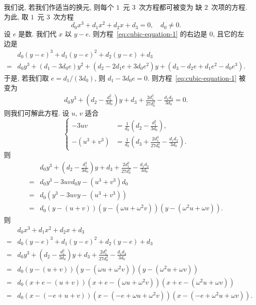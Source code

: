 \documentclass[../libro.tex]{subfiles}
\begin{document}
我们说, 若我们作适当的换元,
则每个 \(1\)~元 \(3\)~次方程都可被变为%
缺 \(2\)~次项的方程.
为此, 取 \(1\)~元 \(3\)~次方程
\begin{equation}
    d_0 x^3 + d_1 x^2 + d_2 x + d_3 = 0,
    \quad d_0 \neq 0.
    \label{eq:cubic-equation-1}
\end{equation}
设 \(e\) 是数.
我们代 \(x\) 以 \(y - e\).
则方程~\eqref{eq:cubic-equation-1} 的右边是 \(0\),
且它的左边是
\begin{align*}
    &
    d_0 (y - e)^3
    + d_1 (y - e)^2
    + d_2 (y - e)
    + d_3
    \\
    = {} &
    d_0 y^3
    + (d_1 - 3d_0 e) y^2
    + (d_2 - 2d_1 e + 3d_0 e^2) y
    + (d_3 - d_2 e + d_1 e^2 - d_0 e^3).
\end{align*}
于是, 若我们取 \(e = d_1/(3d_0)\),
则 \(d_1 - 3d_0 e = 0\).
则方程~\eqref{eq:cubic-equation-1} 被变为
\begin{align*}
    d_0 y^3 + \left(d_2 - \frac{d_1^2}{3d_0} \right)y
    + d_3 + \frac{2 d_1^3}{27 d_0^2} - \frac{d_1 d_2}{3d_0}
    = 0.
\end{align*}
则我们可解此方程.
设 \(u\), \(v\) 适合
\begin{equation*}
    \left\{ %
    \begin{aligned}
        -3uv         & =
        \frac{1}{d_0}
        \left(d_2 - \frac{d_1^2}{3d_0} \right),
        \\
        -(u^3 + v^3) & =
        \frac{1}{d_0}
        \left(d_3 + \frac{2 d_1^3}{27 d_0^2} - \frac{d_1 d_2}{3d_0}\right).
    \end{aligned}
    \right. %
\end{equation*}
则
\begin{align*}
    &
    d_0 y^3 + \left(d_2 - \frac{d_1^2}{3d_0} \right)y
    + d_3 + \frac{2 d_1^3}{27 d_0^2} - \frac{d_1 d_2}{3d_0}
    \\
    = {} &
    d_0 y^3 - 3 u v d_0 y - (u^3 + v^3) d_0
    \\
    = {} &
    d_0 (y^3 - 3 u v y - (u^3 + v^3))
    \\
    = {} &
    d_0
    (y - (u + v))
    (y - (\omega u + \omega^2 v))
    (y - (\omega^2 u + \omega v)).
\end{align*}
则
\begin{align*}
    &
    d_0 x^3 + d_1 x^2 + d_2 x + d_3
    \\
    = {} &
    d_0 (y - e)^3 + d_1 (y - e)^2 + d_2 (y - e) + d_3
    \\
    = {} &
    d_0 y^3 + \left(d_2 - \frac{d_1^2}{3d_0} \right)y
    + d_3 + \frac{2 d_1^3}{27 d_0^2} - \frac{d_1 d_2}{3d_0}
    \\
    = {} &
    d_0
    (y - (u + v))
    (y - (\omega u + \omega^2 v))
    (y - (\omega^2 u + \omega v))
    \\
    = {} &
    d_0
    (x + e - (u + v))
    (x + e - (\omega u + \omega^2 v))
    (x + e - (\omega^2 u + \omega v))
    \\
    = {} &
    d_0
    (x - (-e + u + v))
    (x - (-e + \omega u + \omega^2 v))
    (x - (-e + \omega^2 u + \omega v)).
\end{align*}
\end{document}
